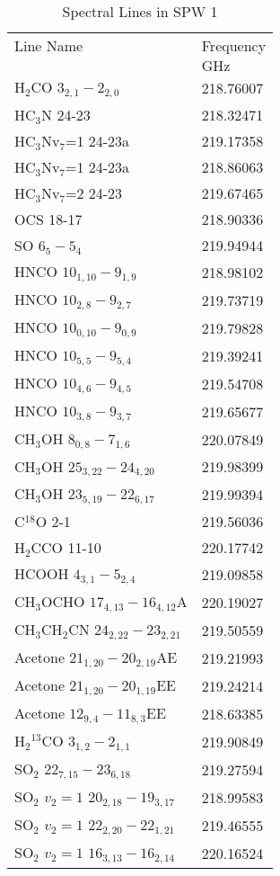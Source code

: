 \begin{table*}[htp]
\caption{Spectral Lines in SPW 1}
\begin{tabular}{ll}
\label{tab:linesspw1}
Line Name & Frequency \\
 & $\mathrm{GHz}$ \\
\hline
H$_2$CO $3_{2,1}-2_{2,0}$ & 218.76007 \\
HC$_3$N 24-23 & 218.32471 \\
HC$_3$Nv$_7$=1 24-23a & 219.17358 \\
HC$_3$Nv$_7$=1 24-23a & 218.86063 \\
HC$_3$Nv$_7$=2 24-23 & 219.67465 \\
OCS 18-17 & 218.90336 \\
SO $6_5-5_4$ & 219.94944 \\
HNCO $10_{1,10}-9_{1,9}$ & 218.98102 \\
HNCO $10_{2,8}-9_{2,7}$ & 219.73719 \\
HNCO $10_{0,10}-9_{0,9}$ & 219.79828 \\
HNCO $10_{5,5}-9_{5,4}$ & 219.39241 \\
HNCO $10_{4,6}-9_{4,5}$ & 219.54708 \\
HNCO $10_{3,8}-9_{3,7}$ & 219.65677 \\
CH$_3$OH $8_{0,8}-7_{1,6}$ & 220.07849 \\
CH$_3$OH $25_{3,22}-24_{4,20}$ & 219.98399 \\
CH$_3$OH $23_{5,19}-22_{6,17}$ & 219.99394 \\
C$^{18}$O 2-1 & 219.56036 \\
H$_2$CCO 11-10 & 220.17742 \\
HCOOH $4_{3,1}-5_{2,4}$ & 219.09858 \\
CH$_3$OCHO $17_{4,13}-16_{4,12}$A & 220.19027 \\
CH$_3$CH$_2$CN $24_{2,22}-23_{2,21}$ & 219.50559 \\
Acetone $21_{1,20}-20_{2,19}$AE & 219.21993 \\
Acetone $21_{1,20}-20_{1,19}$EE & 219.24214 \\
Acetone $12_{9,4}-11_{8,3}$EE & 218.63385 \\
H$_2$$^{13}$CO $3_{1,2}-2_{1,1}$ & 219.90849 \\
SO$_2$ $22_{7,15}-23_{6,18}$ & 219.27594 \\
SO$_2$ $v_2=1$ $20_{2,18}-19_{3,17}$ & 218.99583 \\
SO$_2$ $v_2=1$ $22_{2,20}-22_{1,21}$ & 219.46555 \\
SO$_2$ $v_2=1$ $16_{3,13}-16_{2,14}$ & 220.16524 \\
\hline
\end{tabular}
\end{table*}
